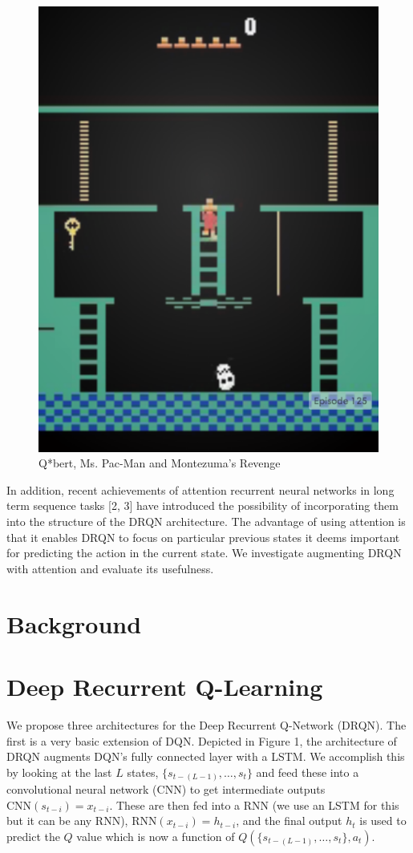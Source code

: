 \documentclass{article}
\begin{document}
\begin{figure}[h]
\begin{minipage}{0.8\textwidth}
            \centering
            \includegraphics[scale=0.15]{MontezumaRevenge}
        \end{minipage}
        \caption{Q*bert, Ms. Pac-Man and Montezuma's Revenge}
    \end{figure}

    In addition, recent achievements of attention recurrent neural networks in
    long term sequence tasks [2, 3] have introduced the possibility of incorporating
    them into the structure of the DRQN architecture.  The advantage of using
    attention is that it enables DRQN to focus on particular previous states it
    deems important for predicting the action in the current state. We investigate
    augmenting DRQN with attention and evaluate its usefulness.

\section{Background}

\section{Deep Recurrent Q-Learning}
We propose three architectures for the Deep Recurrent Q-Network (DRQN). The first
is a very basic extension of DQN. Depicted in Figure 1, the architecture of DRQN
augments DQN's fully connected layer with a LSTM. We accomplish this by looking
at the last $L$ states, $\{s_{t-(L-1)}, \dots, s_{t}\}$ and feed these into a
convolutional neural network (CNN) to get intermediate outputs
$\text{CNN}(s_{t-i}) = x_{t-i}$. These are then fed into a RNN (we use an LSTM
for this but it can be any RNN), $\text{RNN}(x_{t-i}) = h_{t-i}$, and the final
output $h_t$ is used to predict the $Q$ value which is now a function of
$Q(\{s_{t-(L-1)}, \dots, s_t\}, a_t)$.
\end{document}

